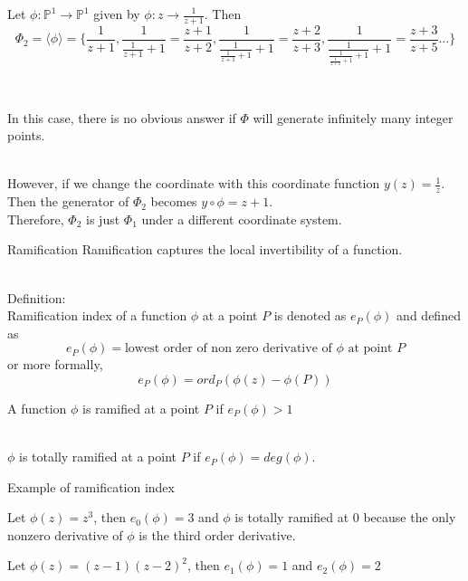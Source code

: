 \documentclass[aspectratio=169,xcolor=dvipsnames]{beamer}
\begin{document}
\begin{frame}{}
    \begin{examples}
        Let $\phi:\mathbb{P}^1\to \mathbb{P}^1$ given by $\phi:z\to \frac{1}{z + 1}$. Then 
        $$\Phi_2 = \langle\phi\rangle = \{\frac{1}{z+1}, \frac{1}{\frac{1}{z+1}+1} = \frac{z+1}{z+2}, \frac{1}{\frac{1}{\frac{1}{z+1}+1}+1} = \frac{z+2}{z+3},\frac{1}{\frac{1}{\frac{1}{\frac{1}{z+1}+1}+1}+1} = \frac{z+3}{z+5} \dots\}$$ 
    \end{examples}\pause 
    ~
    
    In this case, there is no obvious answer if $\Phi$ will generate infinitely many integer points.\pause \\~
    
    However, if we change the coordinate with this coordinate function $y(z) = \frac{1}{z}$. Then the generator of $\Phi_2$ becomes $y\circ\phi = z+1$.\\
    Therefore, $\Phi_2$ is just $\Phi_1$ under a different coordinate system.
\end{frame}

\begin{frame}{Ramification}
    Ramification captures the local invertibility of a function.\pause \\~
    
    Definition:\\
    Ramification index of a function $\phi$ at a point $P$ is denoted as $e_{P}(\phi)$ and defined as 
    $$e_{P}(\phi) = \text{lowest order of non zero derivative of } \phi \text{ at point } P$$
    or more formally, 
    $$e_{P}(\phi) = ord_{P}(\phi(z)-\phi(P))$$ \pause
    
    A function $\phi$ is ramified at a point $P$ if $e_{P}(\phi)>1$
    \pause \\~
    
    $\phi$ is totally ramified at a point $P$ if $e_{P}(\phi) = deg(\phi)$.
\end{frame}

\begin{frame}{Example of ramification index}%
    \begin{examples}
        Let $\phi(z) = z^3$, then $e_0(\phi)= 3$ and $\phi$ is totally ramified at 0 because the only nonzero derivative of $\phi$ is the third order derivative.
    \end{examples}
    \pause
    
    \begin{examples}
        Let $\phi(z) = (z-1)(z-2)^2$, then $e_1(\phi)=1$ and $e_2(\phi)=2$
    \end{examples}
    
\end{frame}
\end{document}
